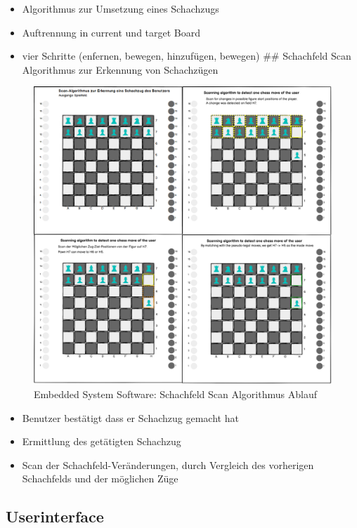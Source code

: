 \begin{itemize}
\tightlist
\item
  Algorithmus zur Umsetzung eines Schachzugs
\item
  Auftrennung in current und target Board
\item
  vier Schritte (enfernen, bewegen, hinzufügen, bewegen) \#\# Schachfeld
  Scan Algorithmus zur Erkennung von Schachzügen
\end{itemize}

\begin{figure}
\centering
\includegraphics{images/ATC_ChessMoveAlgorithm.png}
\caption{Embedded System Software: Schachfeld Scan Algorithmus Ablauf
\label{ATC_ChessMoveAlgorithm}}
\end{figure}

\begin{itemize}
\tightlist
\item
  Benutzer bestätigt dass er Schachzug gemacht hat
\item
  Ermittlung des getätigten Schachzug
\item
  Scan der Schachfeld-Veränderungen, durch Vergleich des vorherigen
  Schachfelds und der möglichen Züge
\end{itemize}

\hypertarget{userinterface}{%
\subsection{Userinterface}\label{userinterface}}

